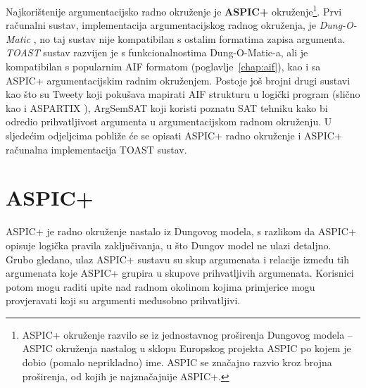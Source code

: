 Najkorištenije argumentacijsko radno okruženje
je \textbf{ASPIC+} okruženje\footnote{
    ASPIC+ okruženje razvilo se iz jednostavnog proširenja Dungovog modela -- 
    ASPIC okruženja 
    nastalog u sklopu Europskog projekta ASPIC po kojem je dobio 
    (pomalo neprikladno) ime. ASPIC se značajno razvio kroz brojna
    proširenja, od kojih je najznačajnije ASPIC+. 
}.
Prvi računalni sustav, implementacija argumentacijskog radnog okruženja, 
je \emph{Dung-O-Matic} \citep{snaith2010pipelining},
no taj sustav nije kompatibilan s ostalim formatima zapisa argumenta. 
\emph{TOAST}  
sustav razvijen je s funkcionalnostima Dung-O-Matic-a, ali 
je kompatibilan s popularnim AIF formatom (poglavlje~\ref{chap:aif}), kao i sa 
ASPIC+ argumentacijskim radnim okruženjem. 
Postoje još brojni drugi sustavi kao što su Tweety \citep{thimm2014tweety} koji
pokušava mapirati AIF strukturu u logički program 
(slično kao i ASPARTIX \citep{egly2008aspartix}),
ArgSemSAT \citep{cerutti2014argsemsat}
koji koristi poznatu SAT \citep{moskewicz2001chaff}
 tehniku kako bi odredio prihvatljivost argumenta
u argumentacijskom radnom okruženju. U sljedećim odjeljcima
pobliže će se opisati ASPIC+ radno okruženje i 
ASPIC+ računalna implementacija TOAST sustav.

\section{ASPIC+}
\label{sec:aspic}

ASPIC+ je radno okruženje nastalo iz Dungovog modela, s razlikom da
ASPIC+ opisuje logička pravila zaključivanja, u što Dungov model ne ulazi detaljno. 
Grubo gledano, ulaz ASPIC+ sustavu su 
skup argumenata i relacije između tih argumenata
koje ASPIC+ grupira u  
 skupove prihvatljivih argumenata. Korisnici potom mogu
raditi upite nad radnom okolinom kojima primjerice mogu
provjeravati koji su argumenti međusobno prihvatljivi. 

